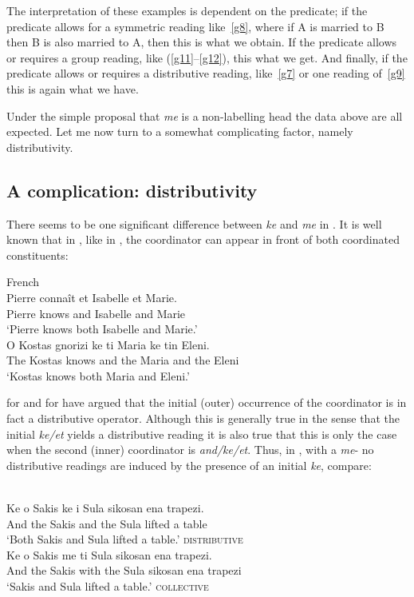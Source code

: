 \documentclass[output=paper]{langsci/langscibook}
\begin{document}
The interpretation of these examples is dependent on the predicate; if the
predicate allows for a symmetric reading like~\eqref{g8}, where if A is married
to B then B is also married to A, then this is what we obtain. If the predicate
allows or requires a group reading, like (\ref{g11}--\ref{g12}), this what we
get. And finally, if the predicate allows or requires a distributive reading,
like~\eqref{g7} or one reading of~\eqref{g9} this is again what we have.

Under the simple proposal that \emph{me} is a non-labelling head the data above
are all expected. Let me now turn to a somewhat complicating factor, namely
distributivity.

\subsection{A complication: distributivity} \label{distro}

There seems to be one significant difference between \emph{ke} and \emph{me} in
. It is well known that in , like in , the
coordinator can appear in front of both coordinated constituents:

\ea\label{ex:29.40} French\\
    \gll    Pierre conna\^it et Isabelle et Marie.\\
            Pierre knows and Isabelle and Marie\\
    \glt    \enquote*{Pierre knows both Isabelle and Marie.}
\ex\label{ex:29.41} \\
	\gll    O Kostas gnorizi ke ti Maria ke tin Eleni.\\
            The Kostas knows and the Maria and the Eleni\\
    \glt    \enquote*{Kostas knows both Maria and Eleni.}
\z

\citet[146, fn.\ 16]{Kayne1994} for  and \citet{cms:15} for  have
argued that the initial (outer) occurrence of the coordinator is in fact a
distributive operator. Although this is generally true in the sense that the
initial \emph{ke/et} yields a distributive reading it is also true that this is
only the case when the second (inner) coordinator is \emph{and/ke/et}. Thus,
in , with a \emph{me}- no distributive readings are induced by
the presence of an initial \emph{ke}, compare:

\ea\label{ex:29.42} \\
	\gll    Ke o Sakis ke i Sula sikosan ena trapezi.\\
            And the Sakis and the Sula lifted a table\\
    \glt    \enquote*{Both Sakis and Sula lifted a table.} \hfill \textsc{distributive}
\ex\label{ex:29.43} \\
	\gll    Ke o Sakis me ti Sula sikosan ena trapezi.\\
            And the Sakis with the Sula sikosan ena trapezi\\
    \glt    \enquote*{Sakis and Sula lifted a table.} \hfill \textsc{collective}
\z
\end{document}
